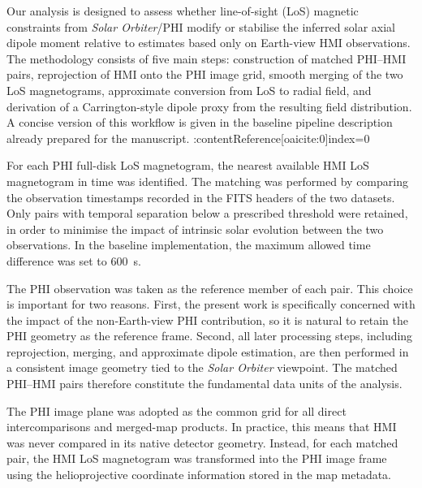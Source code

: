 \documentclass[namedreferences,hyperref,optionalrh]{spr-sola}
\begin{document}
Our analysis is designed to assess whether line-of-sight (LoS) magnetic constraints from \textit{Solar Orbiter}/PHI modify or stabilise the inferred solar axial dipole moment relative to estimates based only on Earth-view HMI observations. The methodology consists of five main steps: construction of matched PHI--HMI pairs, reprojection of HMI onto the PHI image grid, smooth merging of the two LoS magnetograms, approximate conversion from LoS to radial field, and derivation of a Carrington-style dipole proxy from the resulting field distribution. A concise version of this workflow is given in the baseline pipeline description already prepared for the manuscript. :contentReference[oaicite:0]{index=0}


For each PHI full-disk LoS magnetogram, the nearest available HMI LoS magnetogram in time was identified. The matching was performed by comparing the observation timestamps recorded in the FITS headers of the two datasets. Only pairs with temporal separation below a prescribed threshold were retained, in order to minimise the impact of intrinsic solar evolution between the two observations. In the baseline implementation, the maximum allowed time difference was set to 600~s.

The PHI observation was taken as the reference member of each pair. This choice is important for two reasons. First, the present work is specifically concerned with the impact of the non-Earth-view PHI contribution, so it is natural to retain the PHI geometry as the reference frame. Second, all later processing steps, including reprojection, merging, and approximate dipole estimation, are then performed in a consistent image geometry tied to the \textit{Solar Orbiter} viewpoint. The matched PHI--HMI pairs therefore constitute the fundamental data units of the analysis.


The PHI image plane was adopted as the common grid for all direct intercomparisons and merged-map products. In practice, this means that HMI was never compared in its native detector geometry. Instead, for each matched pair, the HMI LoS magnetogram was transformed into the PHI image frame using the helioprojective coordinate information stored in the map metadata.
\end{document}
